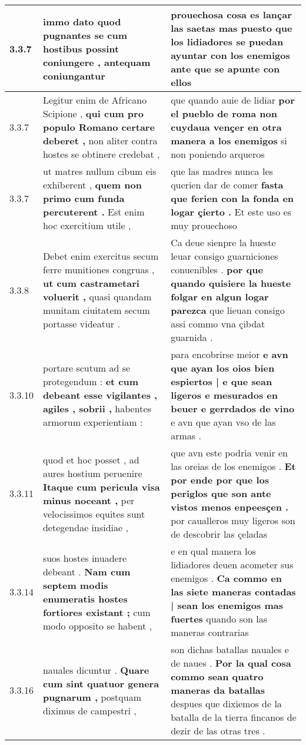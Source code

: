 \begin{tabular}{|p{1cm}|p{6.5cm}|p{6.5cm}|}
3.3.7 & immo dato quod pugnantes \textbf{ se cum hostibus possint coniungere , } antequam coniungantur & prouechosa cosa es lançar las saetas \textbf{ mas puesto que los lidiadores se puedan ayuntar con los enemigos } ante que se apunte con ellos \\\hline
3.3.7 & Legitur enim de Africano Scipione , \textbf{ qui cum pro populo Romano certare deberet , } non aliter contra hostes se obtinere credebat , & que quando auie de lidiar \textbf{ por el pueblo de roma non cuydaua vençer en otra manera a los enemigos } si non poniendo arqueros \\\hline
3.3.7 & ut matres nullum cibum eis exhiberent , \textbf{ quem non primo cum funda percuterent . } Est enim hoc exercitium utile , & que las madres nunca les querien dar de comer \textbf{ fasta que ferien con la fonda en logar çierto . } Et este uso es muy prouechoso \\\hline
3.3.8 & Debet enim exercitus secum ferre munitiones congruas , \textbf{ ut cum castrametari voluerit , } quasi quandam munitam ciuitatem secum portasse videatur . & Ca deue sienpre la hueste leuar consigo guarniciones conuenibles . \textbf{ por que quando quisiere la hueste folgar en algun logar parezca } que lieuan consigo assi commo vna çibdat guarnida . \\\hline
3.3.10 & portare scutum ad se protegendum : \textbf{ et cum debeant esse vigilantes , agiles , sobrii , } habentes armorum experientiam : & para encobrirse meior \textbf{ e avn que ayan los oios bien espiertos | e que sean ligeros e mesurados en beuer e gerrdados de vino } e avn que ayan vso de las armas . \\\hline
3.3.11 & quod et hoc posset , ad aures hostium peruenire \textbf{ Itaque cum pericula visa minus noceant , } per velocissimos equites sunt detegendae insidiae , & que avn este podria venir en las oreias de los enemigos . \textbf{ Et por ende por que los periglos que son ante vistos menos enpeesçen . } por caualleros muy ligeros son de descobrir las çeladas \\\hline
3.3.14 & suos hostes inuadere debeant . \textbf{ Nam cum septem modis enumeratis hostes fortiores existant ; } cum modo opposito se habent , & e en qual manera los lidiadores deuen acometer sus enemigos . \textbf{ Ca commo en las siete maneras contadas | sean los enemigos mas fuertes } quando son las maneras contrarias \\\hline
3.3.16 & nauales dicuntur . \textbf{ Quare cum sint quatuor genera pugnarum , } postquam diximus de campestri , & son dichas batallas nauales e de naues . \textbf{ Por la qual cosa commo sean quatro maneras da batallas } despues que dixiemos de la batalla de la tierra fincanos de dezir de las otras tres . \\\hline

\end{tabular}
